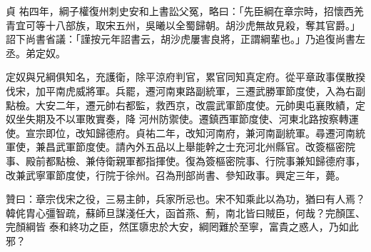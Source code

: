 \begin{pinyinscope}
 貞
 祐四年，綱子權復州刺史安和上書訟父冤，略曰：「先臣綱在章宗時，招懷西羌青宜可等十八部族，取宋五州，吳曦以全蜀歸朝。胡沙虎無故見殺，奪其官爵。」詔下尚書省議：「謹按元年詔書云，胡沙虎屢害良將，正謂綱輩也。」乃追復尚書左丞。弟定奴。



 定奴與兄綱俱知名，充護衛，除平涼府判官，累官同知真定府。從平章政事僕散揆伐宋，加平南虎威將軍。兵罷，遷河南東路副統軍，三遷武勝軍節度使，入為右副點檢。大安二年，遷元帥右都監，救西京，改震武軍節度使。元帥奧屯襄敗績，定奴坐失期及不以軍敗實奏，降
 河州防禦使。遷鎮西軍節度使、河東北路按察轉運使。宣宗即位，改知歸德府。貞祐二年，改知河南府，兼河南副統軍。尋遷河南統軍使，兼昌武軍節度使。請內外五品以上舉能幹之士充河北州縣官。改簽樞密院事、殿前都點檢、兼侍衛親軍都指揮使。復為簽樞密院事、行院事兼知歸德府事，改兼武寧軍節度使，行院于徐州。召為刑部尚書、參知政事。興定三年，薨。



 贊曰：章宗伐宋之役，三易主帥，兵家所忌也。宋不知乘此以為功，猶曰有人焉？韓侂胄心彊智疏，蘇師旦謀淺任大，函首燕、薊，南北皆曰賊臣，何哉？完顏匡、完顏綱皆
 泰和終功之臣，然匡隳忠於大安，綱罔難於至寧，富貴之惑人，乃如此邪？



\end{pinyinscope}